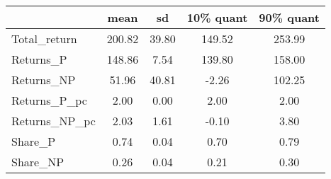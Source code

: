 \begin{tabular}{lcccc}
\toprule
{} &    mean &     sd &  10\% quant &  90\% quant \\
\midrule
Total\_return  &  200.82 &  39.80 &     149.52 &     253.99 \\
Returns\_P     &  148.86 &   7.54 &     139.80 &     158.00 \\
Returns\_NP    &   51.96 &  40.81 &      -2.26 &     102.25 \\
Returns\_P\_pc  &    2.00 &   0.00 &       2.00 &       2.00 \\
Returns\_NP\_pc &    2.03 &   1.61 &      -0.10 &       3.80 \\
Share\_P       &    0.74 &   0.04 &       0.70 &       0.79 \\
Share\_NP      &    0.26 &   0.04 &       0.21 &       0.30 \\
\bottomrule
\end{tabular}
